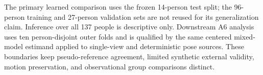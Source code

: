 The primary learned comparison uses the frozen 14-person test split; the
96-person training and 27-person validation sets are not reused for its
generalization claim. Inference over all 137 people is descriptive only.
Downstream A6 analysis uses ten person-disjoint outer folds and is qualified by
the same centered mixed-model estimand applied to single-view and deterministic
pose sources. These boundaries keep pseudo-reference agreement, limited
synthetic external validity, motion preservation, and observational group
comparisons distinct.
